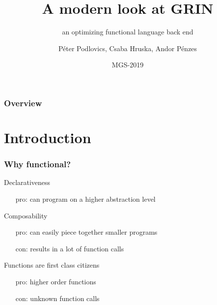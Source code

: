 \documentclass[bigger]{beamer}
\title[GRIN] %
{A modern look at GRIN}
\subtitle{an optimizing functional language back end}
\author[P. Podlovics, Cs. Hruska, Andor Pénzes ] %
{Péter Podlovics, Csaba Hruska, Andor Pénzes}
\institute[ELTE] %
{
	Eötvös Loránd University (ELTE), \\ Budapest, Hungary
}
\date{MGS-2019} %
\begin{document}
	
{
	\frame{\vspace{15mm}\titlepage}
}

\begin{frame}
	\frametitle{Overview}
	\tableofcontents
\end{frame}


\section{Introduction}

\begin{frame}[fragile]
	\frametitle{Why functional?}
	
	\begin{vfitemize}
		\item Declarativeness
			\begin{itemize}
				\item[pro:] can program on a higher abstraction level
			\end{itemize}
		\item Composability\\
			\begin{itemize}
				\item[pro:] can easily piece together smaller programs
				\item[con:] results in a lot of function calls
			\end{itemize}
		\item Functions are first class citizens
			\begin{itemize}
				\item[pro:] higher order functions
				\item[con:] unknown function calls
			\end{itemize}
	\end{vfitemize}

\end{frame}
\end{document}
